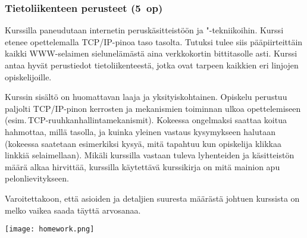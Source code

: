 \documentclass[../ala_hataile.tex]{subfiles}
\begin{document}
	\subsubsection*{Tietoliikenteen perusteet (5~op)}
	Kurssilla paneudutaan internetin peruskäsitteistöön ja "-tekniikoihin. Kurssi etenee opettelemalla TCP/IP-pinoa taso tasolta. Tutuksi tulee siis pääpiirteittäin kaikki WWW-selaimen sielunelämästä aina verkkokortin bittitasolle asti. Kurssi antaa hyvät perustiedot tietoliikenteestä, jotka ovat tarpeen kaikkien eri linjojen opiskelijoille.
	
	Kurssin sisältö on huomattavan laaja ja yksityiskohtainen. Opiskelu perustuu paljolti TCP/IP-pinon kerrosten ja mekanismien toiminnan ulkoa opettelemiseen (esim.\,TCP-ruuhkanhallintamekanismit). Kokeessa ongelmaksi saattaa koitua hahmottaa, millä tasolla, ja kuinka yleinen vastaus kysymykseen halutaan (kokeessa saatetaan esimerkiksi kysyä, mitä tapahtuu kun opiskelija klikkaa linkkiä selaimellaan). Mikäli kurssilla vastaan tuleva lyhenteiden ja käsitteistön määrä alkaa hirvittää, kurssilla käytettävä kurssikirja on mitä mainion apu pelon\-lievitykseen.
	
	Varoitettakoon, että asioiden ja detaljien suuresta määrästä johtuen kurssista on melko vaikea saada täyttä arvosanaa. 
	
	\begin{figure*}[!b]
		\centering
		\texttt{[image: homework.png]}
	\end{figure*}
\end{document}
